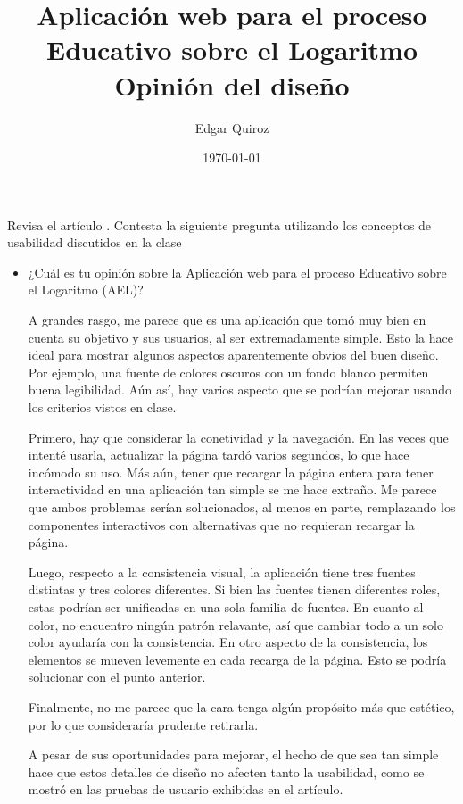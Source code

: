 \documentclass[11pt]{article}
\author{Edgar Quiroz}
\date{\today}
\title{Aplicación web para el proceso Educativo sobre el Logaritmo\\\medskip
\large Opinión del diseño}
\begin{document}
\maketitle
Revisa el artículo
\cite{Salas-Rueda_Gamboa-Rodríguez_Salas-Rueda_Salas-Rueda_2020}. Contesta la
siguiente pregunta utilizando los conceptos de usabilidad discutidos en la clase

\begin{itemize}
\item ¿Cuál es tu opinión sobre la Aplicación web para el proceso Educativo sobre
el Logaritmo (AEL)?

A grandes rasgo, me parece que es una aplicación que tomó muy bien en cuenta
su objetivo y sus usuarios, al ser extremadamente simple. Esto la hace ideal
para mostrar algunos aspectos aparentemente obvios del buen diseño. Por
ejemplo, una fuente de colores oscuros con un fondo blanco permiten buena
legibilidad. Aún así, hay varios aspecto que se podrían mejorar usando los
criterios vistos en clase.

Primero, hay que considerar la conetividad y la navegación. En las veces que
intenté usarla, actualizar la página tardó varios segundos, lo que hace
incómodo su uso. Más aún, tener que recargar la página entera para tener
interactividad en una aplicación tan simple se me hace extraño. Me parece que
ambos problemas serían solucionados, al menos en parte, remplazando los
componentes interactivos con alternativas que no requieran recargar la página.

Luego, respecto a la consistencia visual, la aplicación tiene tres fuentes
distintas y tres colores diferentes. Si bien las fuentes tienen diferentes
roles, estas podrían ser unificadas en una sola familia de fuentes. En cuanto
al color, no encuentro ningún patrón relavante, así que cambiar todo a un solo
color ayudaría con la consistencia. En otro aspecto de la consistencia, los
elementos se mueven levemente en cada recarga de la página. Esto se podría
solucionar con el punto anterior.

Finalmente, no me parece que la cara tenga algún propósito más que estético,
por lo que consideraría prudente retirarla.

A pesar de sus oportunidades para mejorar, el hecho de que sea tan simple hace
que estos detalles de diseño no afecten tanto la usabilidad, como se mostró en
las pruebas de usuario exhibidas en el artículo.
\end{itemize}

\printbibliography
\end{document}
